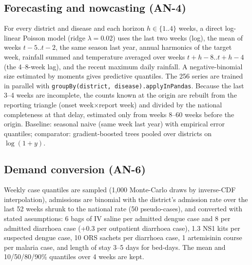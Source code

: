 \documentclass[conference]{IEEEtran}
\begin{document}
\subsection{Forecasting and nowcasting (AN-4)}
For every district and disease and each horizon $h\in\{1..4\}$ weeks, a direct log-linear Poisson model
(ridge $\lambda=0.02$) uses the last two weeks (log), the mean of weeks $t-5..t-2$, the same season last
year, annual harmonics of the target week, rainfall summed and temperature averaged over weeks
$t+h-8..t+h-4$ (the 4--8-week lag), and the recent maximum daily rainfall. A negative-binomial size
estimated by moments gives predictive quantiles. The 256 series are trained in parallel with
\texttt{groupBy(district, disease).applyInPandas}. Because the last 3--4 weeks are incomplete, the counts
known at the origin are rebuilt from the reporting triangle (onset week$\times$report week) and divided by
the national completeness at that delay, estimated only from weeks 8--60 weeks before the origin. Baseline:
seasonal naive (same week last year) with empirical error quantiles; comparator: gradient-boosted trees
pooled over districts on $\log(1+y)$.

\subsection{Demand conversion (AN-6)}
Weekly case quantiles are sampled (1{,}000 Monte-Carlo draws by inverse-CDF interpolation), admissions are
binomial with the district's admission rate over the last 52 weeks shrunk to the national rate (50
pseudo-cases), and converted with stated assumptions: 6 bags of IV saline per admitted dengue case and 8 per
admitted diarrhoea case (+0.3 per outpatient diarrhoea case), 1.3 NS1 kits per suspected dengue case, 10 ORS
sachets per diarrhoea case, 1 artemisinin course per malaria case, and length of stay 3--5 days for bed-days.
The mean and 10/50/80/90\% quantiles over 4 weeks are kept.
\end{document}
